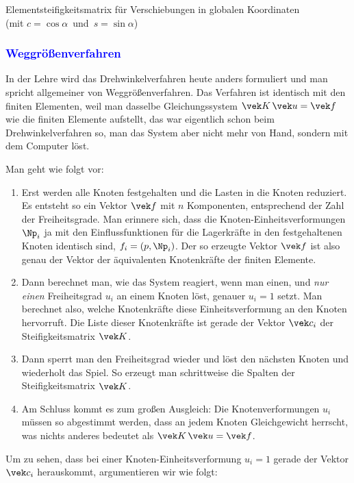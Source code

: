 {\pagebreak
Elementsteifigkeitsmatrix f\"{u}r Verschiebungen in globalen Koordinaten\\ (mit $c=\cos \alpha\,$ und $\,s=\sin\alpha$)

{\textcolor{blue}{\subsubsection*{Weggr\"{o}{\ss}enverfahren}}}
In der Lehre wird das Drehwinkelverfahren heute anders formuliert und man spricht allgemeiner von
Weggr\"{o}{\ss}enverfahren. Das Verfahren ist identisch mit den finiten Elementen, weil man dasselbe Gleichungssystem $\vek K\,\vek u = \vek f$ wie die finiten Elemente aufstellt, das war eigentlich schon beim Drehwinkelverfahren so, man das System aber nicht mehr von Hand, sondern mit dem Computer l\"{o}st.

Man geht wie folgt vor:\\

\begin{enumerate}
  \item Erst werden alle Knoten festgehalten und die Lasten in die Knoten reduziert. Es entsteht so ein Vektor $\vek f$ mit $n$ Komponenten, entsprechend der Zahl der Freiheitsgrade. Man erinnere sich, dass die Knoten-Einheitsverformungen $\Np_i$ ja mit den Einflussfunktionen f\"{u}r die Lagerkr\"{a}fte in den festgehaltenen Knoten identisch sind, $f_i = (p,\Np_i)$. Der so erzeugte Vektor $\vek f$ ist also genau der Vektor der \"{a}quivalenten Knotenkr\"{a}fte der finiten Elemente.
  \item Dann berechnet man, wie das System reagiert, wenn man einen, und {\em nur einen\/} Freiheitsgrad $u_i$ an einem Knoten l\"{o}st, genauer $u_i = 1$ setzt. Man berechnet also, welche Knotenkr\"{a}fte diese Einheitsverformung an den Knoten hervorruft. Die Liste dieser Knotenkr\"{a}fte ist gerade der Vektor $\vek c_i$ der Steifigkeitsmatrix $\vek K$.
  \item Dann sperrt man den Freiheitsgrad wieder und l\"{o}st den n\"{a}chsten Knoten und wiederholt das Spiel. So erzeugt man schrittweise die Spalten der Steifigkeitsmatrix $\vek K$.
  \item Am Schluss kommt es zum gro{\ss}en Ausgleich: Die Knotenverformungen $u_i$ m\"{u}ssen so abgestimmt werden, dass an jedem Knoten Gleichgewicht herrscht, was nichts anderes bedeutet als $\vek K\,\vek u = \vek f$.
\end{enumerate}

Um zu sehen, dass bei einer Knoten-Einheitsverformung $u_i = 1$ gerade der Vektor $\vek c_i$ herauskommt, argumentieren wir wie folgt:

}

